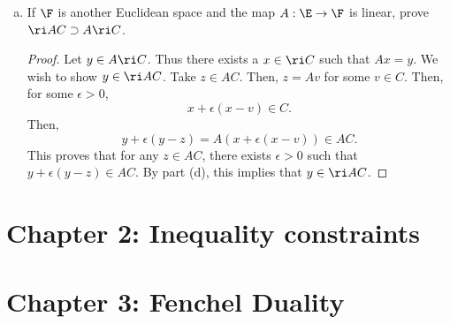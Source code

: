 \documentclass[12pt, letterpaper]{article}
\numberwithin{equation}{subsection}
\begin{document}
\begin{enumerate}[(a)]
\begin{proof}
In other words, $z-x$ is equal to a positive constant times a convex 
combination of elements of $C-x$. But $C-x$ is convex. Therefore, 
it is equal to a positive constant times an element of $C-x$, i.e. 
$z-x\in\R_+(C-x)$. Now let $e^1,\ldots, e^n$ be an orthonormal 
basis for $\aff C-x = \spn{(C-x)}$. By the previous, there exist 
$c_1,\ldots, c_n > 0$ such that $c_ie^i, -c_ie^i\in C-x$ 
for every $i\in[n]$.
This implies that $0\in\ri(C-x)$, i.e. $x\in\ri(C)$.
\end{proof}
\item If $\F$ is another Euclidean space and the map $A:\E\to\F$ is 
linear, prove $\ri AC\supset A\ri C$.
\begin{proof}
Let $y\in A\ri C$. Thus there exists a $x\in\ri C$ such that 
$Ax = y$. We wish to show $y\in \ri AC$. Take $z\in AC$. Then, 
$z=Av$ for some $v\in C$. Then, for some $\epsilon >0$, 
\begin{equation*}
x + \epsilon(x-v)\in C.
\end{equation*}
Then, 
\begin{equation*}
y + \epsilon(y-z) = A(x+\epsilon(x-v)) \in AC.
\end{equation*}
This proves that for any $z\in AC$, there exists $\epsilon > 0$ 
such that $y+\epsilon(y-z) \in AC$. By part (d), this implies that 
$y\in \ri AC$.
\end{proof}
\end{enumerate}

\newpage
\section{Chapter 2: Inequality 
constraints}



\section{Chapter 3: Fenchel Duality}

\newpage

\newpage

\end{document}
